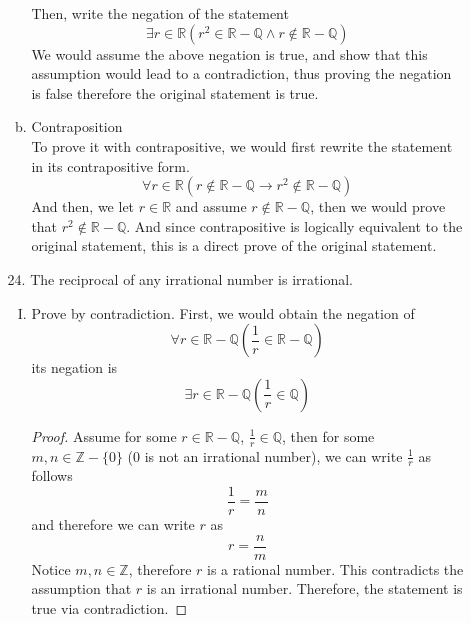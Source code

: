 \documentclass[12pt]{article}
\newcommand{\R}{\mathbb{R}}
\newcommand{\Q}{\mathbb{Q}}
\newcommand{\paren}[1]{\left( #1 \right)}
\newcommand{\then}{\rightarrow}
\begin{document}
\begin{enumerate}
\begin{enumerate}
\begin{enumerate}[a.]
\[                    \]
                    Then, write the negation of the statement
                    \[
                    \exists r \in \R \paren{r^2 \in \R - \Q \wedge r \notin \R - \Q}
                    \]
                    We would assume the above negation is true, and show that this assumption would lead to a contradiction, thus proving the negation is false therefore the original statement is true.
                    \item Contraposition\\
                    To prove it with contrapositive, we would first rewrite the statement in its contrapositive form. 
                    \[
                    \forall r \in \R \paren{ r \notin \R - \Q \then r^2 \notin \R - \Q}
                    \]
                    And then, we let $r \in \R$ and assume $r \notin \R - \Q$, then we would prove that $r^2 \notin \R - \Q$. And since contrapositive is logically equivalent to the original statement, this is a direct prove of the original statement. 
                \end{enumerate}

            \item[24.] The reciprocal of any irrational number is irrational.

                \begin{enumerate}[I.]
                    \item Prove by contradiction. First, we would obtain the negation of
                    \[
                    \forall r \in \mathbb{R} - \mathbb{Q} \left( \frac{1}{r} \in \mathbb{R} - \mathbb{Q} \right)
                    \]
                    its negation is
                    \[
                    \exists r \in \mathbb{R} - \mathbb{Q} \left( \frac{1}{r} \in \mathbb{Q} \right)
                    \]
                    \begin{proof}
                        Assume for some \( r \in \mathbb{R} - \mathbb{Q} \), \( \frac{1}{r} \in \mathbb{Q} \), then for some \( m, n \in \mathbb{Z} - \{0\} \) (0 is not an irrational number), we can write \( \frac{1}{r} \) as follows
                        \[
                        \frac{1}{r} = \frac{m}{n}
                        \]
                        and therefore we can write \( r \) as
                        \[
                        r = \frac{n}{m}
                        \]
                        Notice \( m, n \in \mathbb{Z} \), therefore \( r \) is a rational number. This contradicts the assumption that \( r \) is an irrational number. Therefore, the statement is true via contradiction.
                    \end{proof}
                    

\end{enumerate}
\end{enumerate}
\end{enumerate}
\end{document}
